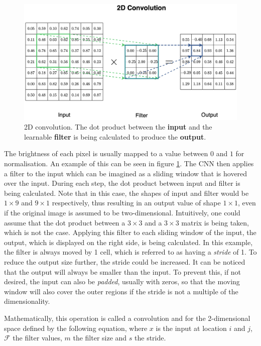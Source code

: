 \documentclass[11pt]{scrartcl}
\begin{document}
\begin{figure}[hbt]
	\center
	\includegraphics[width=1.0\textwidth]{img/general/convolution.png}
	\caption{2D convolution. The dot product between the \textcolor{viridis7}{\textbf{input}} and the learnable \textcolor{viridis5}{\textbf{filter}} is being calculated to produce the \textcolor{viridis2}{\textbf{output}}.}
	\label{fig:convolution}
\end{figure}

The brightness of each pixel is usually mapped to a value between $0$ and $1$ for normalisation. An example of this can be seen in figure \ref{fig:convolution}. The CNN then applies a filter to the input which can be imagined as a sliding window that is hovered over the input. During each step, the dot product between input and filter is being calculated. Note that in this case, the shapes of input and filter would be $1\times9$ and $9\times1$ respectively, thus resulting in an output value of shape $1\times1$, even if the original image is assumed to be two-dimensional. Intuitively, one could assume that the dot product between a $3\times3$ and a $3\times3$ matrix is being taken, which is not the case. Applying this filter to each sliding window of the input, the output, which is displayed on the right side, is being calculated. In this example, the filter is always moved by 1 cell, which is referred to as having a \textit{stride} of 1. To reduce the output size further, the stride could be increased. It can be noticed that the output will always be smaller than the input. To prevent this, if not desired, the input can also be \textit{padded}, usually with zeros, so that the moving window will also cover the outer regions if the stride is not a multiple of the dimensionality.

Mathematically, this operation is called a convolution and for the 2-dimensional space defined by the following equation, where $x$ is the input at location $i$ and $j$, $\mathcal{F}$ the filter values, $m$ the filter size and $s$ the stride.
\end{document}
